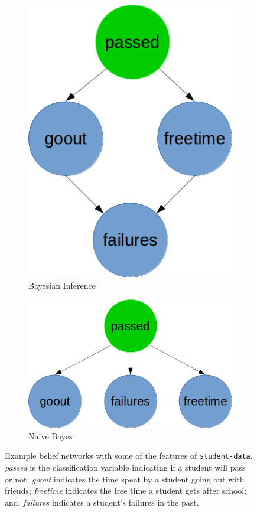\documentclass{article}
\begin{document}
	\begin{figure}[h]
		\centering
		\begin{subfigure}[h]{0.4\textwidth}
			\centering
			\includegraphics[scale=0.4]{example_belief_network_full}
			\caption{Bayesian Inference}
			\label{fig:belief_bayesian_inference}
		\end{subfigure}
		\begin{subfigure}[h]{0.4\textwidth}
			\centering
			\includegraphics[scale=0.4]{example_belief_network_naive}
			\caption{Naive Bayes}
			\label{fig:belief_naive_bayes}
		\end{subfigure}
		\caption{Example belief networks with some of the features of \texttt{student-data}. \emph{passed} is the classification variable indicating if a student will pass or not; \emph{goout} indicates the time spent by a student going out with friends; \emph{freetime} indicates the free time a student gets after school; and, \emph{failures} indicates a student's failures in the past.}
	\end{figure}
	
\end{document}
